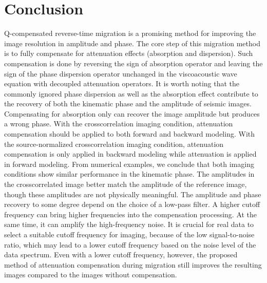 



\section{Conclusion}
Q-compensated reverse-time migration is a promising method for improving the image resolution in amplitude and phase. The core step of this migration method is to fully compensate for attenuation effects (absorption and dispersion). Such compensation is done by reversing the sign of absorption operator and leaving the sign of the phase dispersion operator unchanged in the viscoacoustic wave equation with decoupled attenuation operators. It is worth noting that the commonly ignored phase dispersion as well as the absorption effect contribute to the recovery of both the kinematic phase and the amplitude of seismic images. Compensating for absorption only can recover the image amplitude but produces a wrong phase. 
With the crosscorrelation imaging condition, attenuation compensation should be applied to both forward and backward modeling. With the source-normalized crosscorrelation imaging condition, attenuation compensation is only applied in backward modeling while attenuation is applied in forward modeling. From numerical examples, we conclude that both imaging conditions show similar performance in the kinematic phase. The amplitudes in the crosscorrelated image better match the amplitude of the reference image, though these amplitudes are not physically meaningful. 
The amplitude and phase recovery to some degree depend on the choice of a low-pass filter. A higher cutoff frequency can bring higher frequencies into the compensation processing. At the same time, it can amplify the high-frequency noise. It is crucial for real data to select a suitable cutoff frequency for imaging, because of the low signal-to-noise ratio, which may lead to a lower cutoff frequency based on the noise level of the data spectrum. Even with a lower cutoff frequency, however, the proposed method of attenuation compensation during migration still improves the resulting images compared to the images without compensation.

